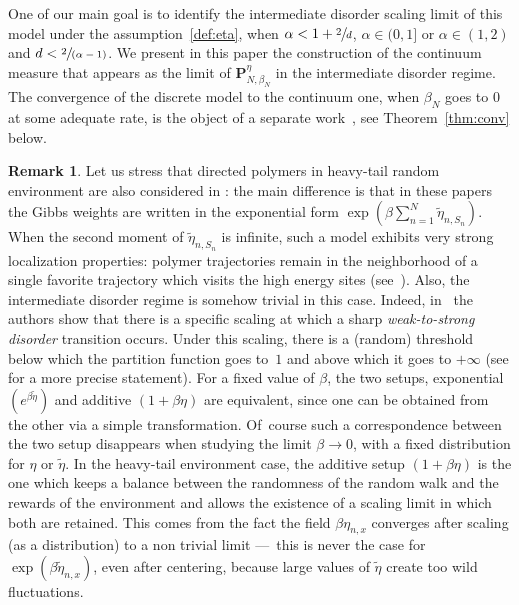 \documentclass[10pt]{amsart}
\newcommand{\spfrac}[2]{\sfrac{#1}{(#2)}}
\theoremstyle{definition}
\newtheorem{rem}[theorem]{Remark}
\newcommand{\bP}{{\ensuremath{\mathbf P}} }
\let\gb\beta
\begin{document}
One of our main goal is to identify the intermediate disorder scaling limit of this model under the assumption~\eqref{def:eta}, when $\alpha<1+\sfrac{2}{d}$, \ie $\alpha\in (0,1]$ or $\alpha \in (1,2)$ and $d<\spfrac{2}{\alpha-1}$.
We present in this paper the construction of the continuum measure that appears as the limit of $\bP_{N,\gb_N}^{\eta}$ in the intermediate disorder regime. The convergence of the discrete model to the continuum one, when $\beta_N$ goes to $0$
at some adequate rate, is the object of a separate work~\cite{BL20_disc},
see Theorem~\ref{thm:conv} below.

\begin{rem}
\label{rem:weights}
Let us stress that
directed polymers in heavy-tail random environment are also considered in \cite{AL11,BT19,DZ16}:
the main difference is that in these papers the Gibbs weights are written in the exponential form $\exp(\gb \sum_{n=1}^N \tilde \eta_{n,S_n})$.
When the second moment of $\tilde \eta_{n,S_n}$ is infinite,
such a model exhibits very strong localization properties:
polymer trajectories remain in the neighborhood of a single favorite trajectory which visits the high energy sites (see~\cite{AL11,BT19}).
Also, the intermediate disorder regime is somehow trivial
in this case. Indeed, in~\cite{BT19} the authors show that there is a specific scaling at which
a sharp \emph{weak-to-strong disorder} transition occurs.
Under this scaling, there is a (random) threshold below which
the partition function goes to~$1$ and above which it goes to $+\infty$ (see \cite[Th.\,2.7-2.8]{BT19}
for a more precise statement).
For a fixed value of $\beta$, the two setups, exponential $(e^{\gb \tilde \eta})$ and additive $(1+\beta\eta)$ are equivalent, since one can be obtained from the other via a simple transformation. Of~course such a correspondence between the two setup disappears when studying the limit $\beta\to 0$, with a fixed distribution for $\eta$ or $\tilde \eta$. In the heavy-tail environment case, the additive setup $(1+\beta \eta)$ is the one which keeps a balance between the randomness of the random walk and the rewards of the environment and allows the existence of a scaling limit in which both are retained.
This comes from the fact the field $\gb \eta_{n,x}$ converges after scaling (as a distribution) to a non trivial limit ---~this is never the case for $\exp(\gb \tilde \eta_{n,x})$, even after centering, because large values of $\tilde \eta$ create too wild fluctuations.
\end{rem}

\end{document}
